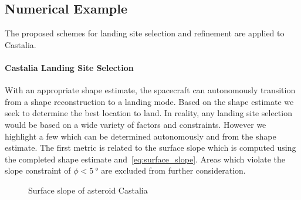\documentclass[journal]{new-aiaa}
\begin{document}
\subsection{Numerical Example}

The proposed schemes for landing site selection and refinement are applied to Castalia.



\paragraph{Castalia Landing Site Selection}

With an appropriate shape estimate, the spacecraft can autonomously transition from a shape reconstruction to a landing mode.
Based on the shape estimate we seek to determine the best location to land. 
In reality, any landing site selection would be based on a wide variety of factors and constraints. 
However we highlight a few which can be determined autonomously and from the shape estimate.
The first metric is related to the surface slope which is computed using the completed shape estimate and~\cref{eq:surface_slope}.
Areas which violate the slope constraint of \( \phi < \SI{5}{\degree} \) are excluded from further consideration.
\begin{figure}[htbp]
    \centering
    \caption{Surface slope of asteroid Castalia\label{fig:surface_slope_castalia_both}}
\end{figure}
\end{document}
